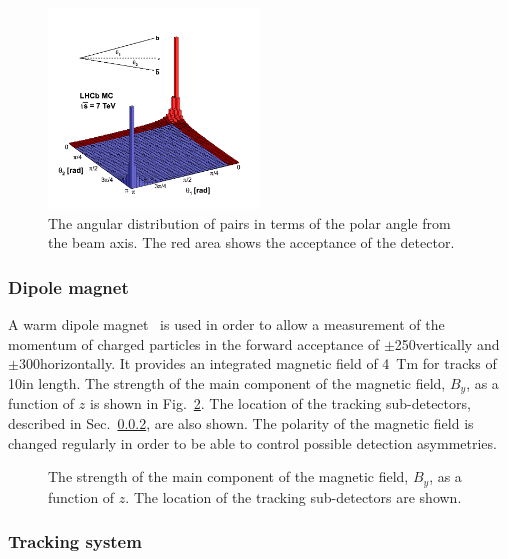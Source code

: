 \begin{figure}[!tb]
\centering
\includegraphics[width=0.5\textwidth]{figs/detector/b_bbar_correlation.pdf}
\caption{The angular distribution of \bquark\bquarkbar pairs in terms of the polar angle from the beam axis. The red area shows the acceptance of the \lhcb detector.}
\label{fig:b_bbar_correlation}
\end{figure}


\subsubsection{Dipole magnet}

A warm dipole magnet~\cite{LHCb-TDR-001} is used in order to allow a measurement of the momentum of charged particles in the forward acceptance of $\pm$250\mrad vertically and $\pm$300\mrad horizontally. It provides an integrated magnetic field of 4~Tm for tracks of 10\m in length. The strength of the main component of the magnetic field, $B_{y}$, as a function of $z$ is shown in Fig.~\ref{fig:magnet}. The location of the tracking sub-detectors, described in Sec.~\ref{sec:lhcb:tracking}, are also shown. The polarity of the magnetic field is changed regularly in order to be able to control possible detection asymmetries.

\begin{figure}[!tb]
\centering
{}
\caption{The strength of the main component of the magnetic field, $B_{y}$, as a function of $z$. The location of the tracking sub-detectors are shown.}
\label{fig:magnet}
\end{figure}

\subsubsection{Tracking system}
\label{sec:lhcb:tracking}

